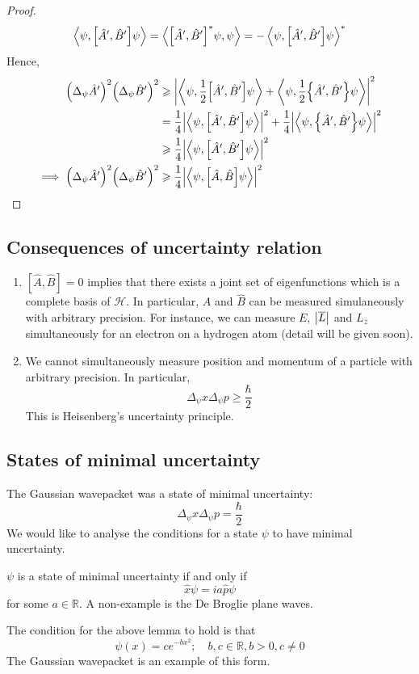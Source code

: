 \documentclass[a4paper,11pt]{article}
\begin{document}
\begin{proof}
	\[
		\left\langle{\psi, \qty[\hat A', \hat B'] \psi}\right\rangle = \left\langle{\qty[\hat A', \hat B']^* \psi, \psi}\right\rangle = -\left\langle{\psi, \qty[\hat A', \hat B'] \psi}\right\rangle^*
	\]
	Hence,
	\begin{align*}
		\qty(\Delta_\psi \hat A')^2 \qty(\Delta_\psi \hat B')^2            & \geqslant \abs{\left\langle{\psi, \frac{1}{2} \qty[\hat A', \hat B'] \psi}\right\rangle + \left\langle{\psi, \frac{1}{2} \qty{\hat A', \hat B'} \psi}\right\rangle}^2     \\
		                                                                   & = \frac{1}{4} \abs{\left\langle{\psi, \qty[\hat A', \hat B'] \psi}\right\rangle}^2 + \frac{1}{4} \abs{\left\langle{\psi, \qty{\hat A', \hat B'}\psi}\right\rangle}^2 \\
		                                                                   & \geqslant \frac{1}{4} \abs{\left\langle{\psi, \qty[\hat A', \hat B'] \psi}\right\rangle}^2                                                             \\
		\implies \qty(\Delta_\psi \hat A')^2 \qty(\Delta_\psi \hat B')^2 & \geqslant \frac{1}{4} \abs{\left\langle{\psi, \qty[\hat A, \hat B] \psi}\right\rangle}^2\qedhere
	\end{align*}
\end{proof}

\subsection{Consequences of uncertainty relation}
\begin{enumerate}
	\item \( [\hat A, \hat B] = 0 \) implies that there exists a joint set of eigenfunctions which is a complete basis of \( \mathcal H \).
	      In particular, \( \hat A \) and \( \hat B \) can be measured simulaneously with arbitrary precision.
	      For instance, we can measure \( E \), \( \abs{\overline L} \) and \( L_z \) simultaneously for an electron on a hydrogen atom (detail will be given soon).
	\item We cannot simultaneously measure position and momentum of a particle with arbitrary precision.
	      In particular,
	      \[
		      \Delta_\psi x \Delta_\psi p \geq \frac{\hbar}{2}
	      \]
	      This is Heisenberg's uncertainty principle.
\end{enumerate}

\subsection{States of minimal uncertainty}
The Gaussian wavepacket was a state of minimal uncertainty:
\[
	\Delta_\psi x \Delta_\psi p = \frac{\hbar}{2}
\]
We would like to analyse the conditions for a state \( \psi \) to have minimal uncertainty.
\begin{lemma}
	\( \psi \) is a state of minimal uncertainty if and only if
	\[
		\hat x \psi = i a \hat p \psi
	\]
	for some \( a \in \mathbb R \).
	A non-example is the De Broglie plane waves.
\end{lemma}
\begin{lemma}
	The condition for the above lemma to hold is that
	\[
		\psi(x) = ce^{-bx^2};\quad b,c \in \mathbb R, b > 0, c \neq 0
	\]
	The Gaussian wavepacket is an example of this form.
\end{lemma}
\end{document}
